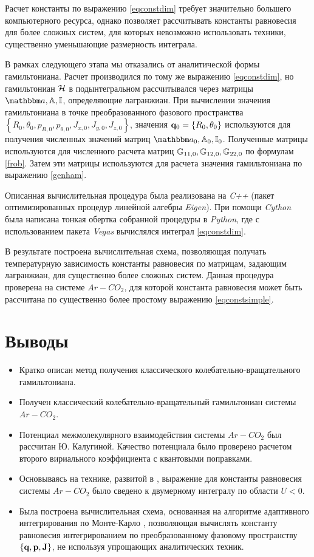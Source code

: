 Расчет константы по выражению \eqref{eqconstdim} требует значительно большего компьютерного ресурса, однако позволяет рассчитывать константы равновесия для более сложных систем, для которых невозможно использовать техники, существенно уменьшающие размерность интеграла. \par 
В рамках следующего этапа мы отказались от аналитической формы гамильтониана. Расчет производился по тому же выражению \eqref{eqconstdim}, но гамильтониан $\mathcal{H}$ в подынтегральном рассчитывался через матрицы $\bba, \bbA, \bbI$, определяющие лагранжиан. При вычислении значения гамильтониана в точке преобразованного фазового пространства $\left\{ R_0, \theta_0, p_{R, 0}, p_{\theta, 0}, J_{x, 0}, J_{y, 0}, J_{z, 0} \right\}$, значения $\mathbf{q}_{0} = \left\{ R_0, \theta_0 \right\}$ используются для получения численных значений матриц $\bba_0, \bbA_0, \bbI_0$. Полученные матрицы используются для численного расчета матриц $\mathbb{G}_{11, 0}, \mathbb{G}_{12, 0}, \mathbb{G}_{22, 0}$ по формулам \eqref{frob}. Затем эти матрицы используются для расчета значения гамильтониана по выражению \eqref{genham}. \par
Описанная вычислительная процедура была реализована на \textit{C++} (пакет оптимизированных процедур линейной алгебры \textit{Eigen}). При помощи \textit{Cython} была написана тонкая обертка собранной процедуры в \textit{Python}, где с использованием пакета \textit{Vegas} вычислялся интеграл \eqref{eqconstdim}. \par 
В результате построена вычислительная схема, позволяющая получать температурную зависимость константы равновесия по матрицам, задающим лагранжиан, для существенно более сложных систем. Данная процедура проверена на системе $Ar-CO_2$, для которой константа равновесия может быть рассчитана по существенно более простому выражению \eqref{eqconstsimple}.   

\section{Выводы}

\begin{itemize}
 \item Кратко описан метод получения классического колебательно-вращательного гамильтониана.
 \item Получен классический колебательно-вращательный гамильтониан системы $Ar-CO_2$.
 \item Потенциал межмолекулярного взаимодействия системы $Ar-CO_2$ был рассчитан Ю. Калугиной. Качество потенциала было проверено расчетом второго вириального коэффициента с квантовыми поправками. 
 \item Основываясь на технике, развитой в \cite{vigasin2015}, выражение для константы равновесия системы $Ar-CO_2$ было сведено к двумерному интегралу по области $U < 0$.
 \item Была построена вычислительная схема, основанная на алгоритме адаптивного интегрирования по Монте-Карло \cite{lepage1978, vegas}, позволяющая вычислять константу равновесия интегрированием по преобразованному фазовому пространству $\left\{ \mathbf{q}, \mathbf{p}, \mathbf{J} \right\}$, не используя упрощающих аналитических техник. 
\end{itemize}

